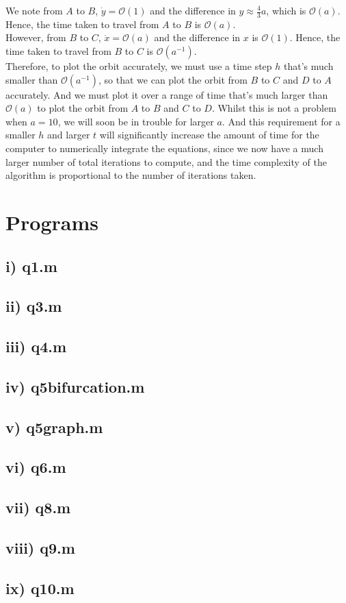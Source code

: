 \documentclass[10pt]{article}
\begin{document}
We note from $A$ to $B$, $\dot{y}=\mathcal{O}(1)$ and the difference in $y\approx\frac{4}{3}a$, which is $\mathcal{O}(a)$. Hence, the time taken to travel from $A$ to $B$ is $\mathcal{O}(a)$.\\
However, from $B$ to $C$, $\dot{x}=\mathcal{O}(a)$ and the difference in $x$ is $\mathcal{O}(1)$. Hence, the time taken to travel from $B$ to $C$ is $\mathcal{O}(a^{-1})$.\\
Therefore, to plot the orbit accurately, we must use a time step $h$ that's much smaller than $\mathcal{O}(a^{-1})$, so that we can plot the orbit from $B$ to $C$ and $D$ to $A$ accurately. And we must plot it over a range of time that's much larger than $\mathcal{O}(a)$ to plot the orbit from $A$ to $B$ and $C$ to $D$. Whilst this is not a problem when $a=10$, we will soon be in trouble for larger $a$. And this requirement for a smaller $h$ and larger $t$ will significantly increase the amount of time for the computer to numerically integrate the equations, since we now have a much larger number of total iterations to compute, and the time complexity of the algorithm is proportional to the number of iterations taken.


\newpage
\section*{Programs}
\subsection*{i) q1.m}

\newpage
\subsection*{ii) q3.m}

\newpage
\subsection*{iii) q4.m}

\newpage
\subsection*{iv) q5\textunderscore bifurcation.m}

\newpage
\subsection*{v) q5\textunderscore graph.m}

\newpage
\subsection*{vi) q6.m}

\newpage
\subsection*{vii) q8.m}

\newpage
\subsection*{viii) q9.m}

\newpage
\subsection*{ix) q10.m}

\end{document}
